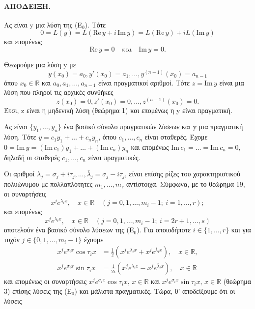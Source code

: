 \documentclass[11pt,a4paper,twoside]{book}
\begin{document}
\paragraph{ΑΠΟΔΕΙΞΗ.} 
\begin{rlist}
\item  Ας είναι y μια λύση της (Ε$_0$). Τότε
\[
    0=L(y)=L(\text{Re}\,y+i\,\text{Im}\,y)=L(\text{Re}\,y)+i L(\text{Im}\,y)
\]
και επομένως
\[
    \text{Re}\,y=0 \quad \text{και} \quad \text{Im}\,y=0.
\]
\item  Θεωρούμε μια λύση y με
\[
    y(x_0)=a_0, y'(x_0)=a_1, \dots, y^{(n-1)}(x_0)=a_{n-1}
\]
όπου $x_0\in\mathbb{R}$ και $a_0, a_1, \dots, a_{n-1}$ είναι πραγματικοί αριθμοί. Τότε $z=\text{Im}\,y$ είναι μια λύση που πληροί τις αρχικές συνθήκες
\[
    z(x_0)=0, z'(x_0)=0, \dots, z^{(n-1)}(x_0)=0.
\]
Έτσι, z είναι η μηδενική λύση (θεώρημα 1) και επομένως η y είναι πραγματική.

\item Ας είναι $\{y_1, \dots, y_n\}$ ένα βασικό σύνολο πραγματικών λύσεων και y μια πραγματική λύση. Τότε $y=c_1y_1+\dots+c_ny_n$, όπου $c_1, \dots, c_n$ είναι σταθερές. Έχομε $0=\text{Im}\,y=(\text{Im}\,c_1)y_1+\dots+(\text{Im}\,c_n)y_n$ και επομένως $\text{Im}\,c_1=\dots=\text{Im}\,c_n=0$, δηλαδή οι σταθερές $c_1, \dots, c_n$ είναι πραγματικές.

\item  Οι αριθμοί $\lambda_j=\sigma_j+i\tau_j, \dots, \bar{\lambda}_j=\sigma_j-i\tau_j$, είναι επίσης ρίζες του χαρακτηριστικού πολυώνυμου με πολλαπλότητες $m_1, \dots, m_r$ αντίστοιχα. Σύμφωνα, με το θεώρημα 19, οι συναρτήσεις
\[
    x^j e^{\lambda_i x}, \quad x\in\mathbb{R} \quad (j=0,1,\dots,m_i-1; \ i=1,\dots,r);
\]
και επομένως
\[
    x^j e^{\lambda_i x}, \quad x\in\mathbb{R} \quad (j=0,1,\dots,m_i-1; \ i=2r+1,\dots,s)
\]
αποτελούν ένα βασικό σύνολο λύσεων της (Ε$_0$). Για οποιοδήποτε $i\in\{1,\dots,r\}$ και για τυχόν $j\in\{0,1,\dots,m_i-1\}$ έχουμε
\begin{align*}
    x^j e^{\sigma_i x}\cos\tau_i x &= \frac{1}{2}\left(x^j e^{\lambda_i x} + x^j e^{\bar{\lambda}_i x}\right), \quad x\in\mathbb{R}, \\
    x^j e^{\sigma_i x}\sin\tau_i x &= \frac{1}{2i}\left(x^j e^{\lambda_i x} - x^j e^{\bar{\lambda}_i x}\right), \quad x\in\mathbb{R}
\end{align*}
και επομένως οι συναρτήσεις $x^j e^{\sigma_i x}\cos\tau_i x$, $x\in\mathbb{R}$ και $x^j e^{\sigma_i x}\sin\tau_i x$, $x\in\mathbb{R}$ (θεώρημα 3) επίσης λύσεις της (Ε$_0$) και μάλιστα πραγματικές. Τώρα, θ' αποδείξουμε ότι οι λύσεις
\end{rlist}
\end{document}
